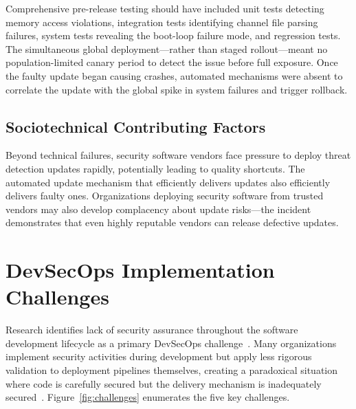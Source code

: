 \documentclass[sigconf,nonacm]{acmart}
\begin{document}
Comprehensive pre-release testing should have included unit tests detecting memory access
violations, integration tests identifying channel file parsing failures, system tests
revealing the boot-loop failure mode, and regression tests. The simultaneous global
deployment---rather than staged rollout---meant no population-limited canary period to
detect the issue before full exposure. Once the faulty update began causing crashes,
automated mechanisms were absent to correlate the update with the global spike in system
failures and trigger rollback.

\subsection{Sociotechnical Contributing Factors}

Beyond technical failures, security software vendors face pressure to deploy threat
detection updates rapidly, potentially leading to quality shortcuts. The automated update
mechanism that efficiently delivers updates also efficiently delivers faulty ones.
Organizations deploying security software from trusted vendors may also develop complacency
about update risks---the incident demonstrates that even highly reputable vendors can
release defective updates.

\section{DevSecOps Implementation Challenges}

Research identifies lack of security assurance throughout the software development lifecycle
as a primary DevSecOps challenge~\cite{yankel2022devsecops}. Many organizations implement
security activities during development but apply less rigorous validation to deployment
pipelines themselves, creating a paradoxical situation where code is carefully secured but
the delivery mechanism is inadequately secured~\cite{ladisa2023sok}. Figure~\ref{fig:challenges}
enumerates the five key challenges.
\end{document}
